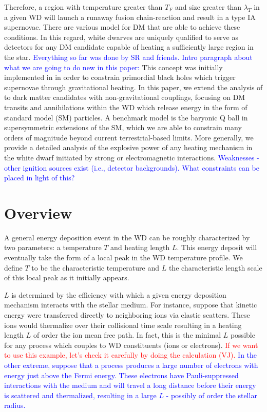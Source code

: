 \documentclass[twocolumn,showpacs,preprintnumbers,amsmath,amssymb,prl]{revtex4}
\begin{document}
Therefore, a region with temperature greater than $T_F$ and size greater than $\lambda_T$ in a given WD will launch a runaway fusion chain-reaction and result in a type IA supernovae. There are various model for DM that are able to achieve these conditions. In this regard, white dwarves are uniquely qualified to serve as detectors for any DM candidate capable of heating a sufficiently large region in the star. \textcolor{blue}{Everything so far was done by SR and friends. Intro paragraph about what we are going to do new in this paper:} This concept was initially implemented in \cite{Graham:2015apa} in order to constrain primordial black holes which trigger supernovae through gravitational heating. In this paper, we extend the analysis of \cite{Graham:2015apa} to dark matter candidates with non-gravitational couplings, focusing on DM transits and annihilations within the WD which release energy in the form of standard model (SM) particles. A benchmark model is the baryonic Q ball in supersymmetric extensions of the SM, which we are able to constrain many orders of magnitude beyond current terrestrial-based limits. More generally, we provide a detailed analysis of the explosive power of any heating mechanism in the white dwarf initiated by strong or electromagnetic interactions. 
\textcolor{blue}{Weaknesses - other ignition sources exist (i.e., detector backgrounds). What constraints can be placed in light of this?}


\section{Overview}

A general energy deposition event in the WD can be roughly characterized by two parameters: a temperature $T$ and heating length $L$. This energy deposit will eventually take the form of a local peak in the WD temperature profile. We define $T$ to be the characteristic temperature and $L$ the characteristic length scale of this local peak as it initially appears.  

$L$ is determined by the efficiency with which a given energy deposition mechanism interacts with the stellar medium. For instance, suppose that kinetic energy were transferred directly to neighboring ions via elastic scatters. These ions would thermalize over their collisional time scale resulting in a heating length $L$ of order the ion mean free path. In fact, this is the minimal $L$ possible for any process which couples to WD constituents (ions or electrons). \textcolor{red}{If we want to use this example, let's check it carefully by doing the calculation (VJ).} \textcolor{blue}{In the other extreme, suppose that a process produces a large number of electrons with energy just above the Fermi energy.  These electrons have Pauli-suppressed interactions with the medium and will travel a long distance before their energy is scattered and thermalized, resulting in a large $L$ - possibly of order the stellar radius.}  
\end{document}
